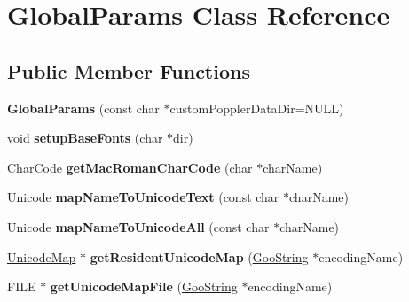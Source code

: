 \hypertarget{class_global_params}{}\section{Global\+Params Class Reference}
\label{class_global_params}
\subsection*{Public Member Functions}
\begin{DoxyCompactItemize}
\item 
\mbox{\label{class_global_params_a59f0699d873defeff2aad94f83f1351f}} 
{\bfseries Global\+Params} (const char $\ast$custom\+Poppler\+Data\+Dir=N\+U\+LL)
\item 
\mbox{\label{class_global_params_afde48fa7f27f173b3dbf3aa842c85930}} 
void {\bfseries setup\+Base\+Fonts} (char $\ast$dir)
\item 
\mbox{\label{class_global_params_a654266b8c1dea162e7afd1da0d62198d}} 
Char\+Code {\bfseries get\+Mac\+Roman\+Char\+Code} (char $\ast$char\+Name)
\item 
\mbox{\label{class_global_params_a5372c9bd4b9fcad33e9c5f085cb6e4d8}} 
Unicode {\bfseries map\+Name\+To\+Unicode\+Text} (const char $\ast$char\+Name)
\item 
\mbox{\label{class_global_params_aa32567e4974fecd08f45ed21ed4a32e4}} 
Unicode {\bfseries map\+Name\+To\+Unicode\+All} (const char $\ast$char\+Name)
\item 
\mbox{\label{class_global_params_a8925c4e952988e2647f11145a0e9acfe}} 
\hyperlink{class_unicode_map}{Unicode\+Map} $\ast$ {\bfseries get\+Resident\+Unicode\+Map} (\hyperlink{class_goo_string}{Goo\+String} $\ast$encoding\+Name)
\item 
\mbox{\label{class_global_params_a3e16311d8c27c162c819cf9257eb2d87}} 
F\+I\+LE $\ast$ {\bfseries get\+Unicode\+Map\+File} (\hyperlink{class_goo_string}{Goo\+String} $\ast$encoding\+Name)
\item 
\mbox{\label{class_global_params_aeabcbf54ac237e0402fc60cf8858d51c}} 

\end{DoxyCompactItemize}
